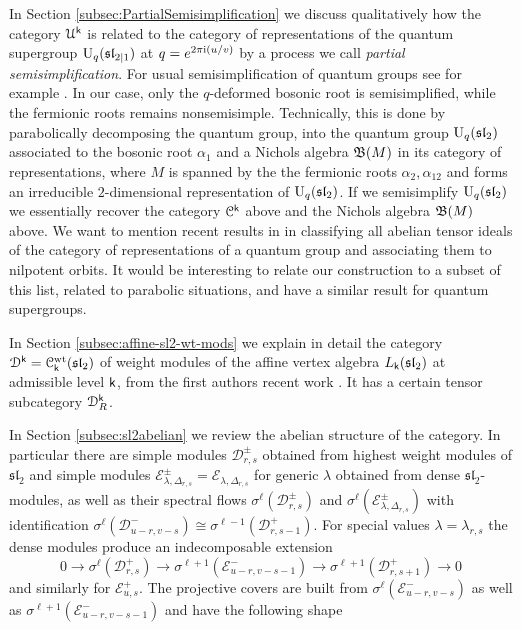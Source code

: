 \documentclass[a4paper, reqno]{amsart}
\theoremstyle{introTheorems}
\newcommand\cC{\mathcal{C}}
\newcommand\cD{\mathcal{D}}
\newcommand\cE{\mathcal{E}}
\newcommand\cU{\mathcal{U}}
\renewcommand\sl{\mathfrak{sl}}
\renewcommand{\1}{\mathbbold{1}}
\begin{document}
In Section \ref{subsec:PartialSemisimplification} we discuss qualitatively how the category $\cU^\k$ is related to the category of representations of the quantum supergroup $\Uq(\sl_{2|1})$ at $q=e^{2\pi\mathrm{i}(u/v)}$ by a process we call \emph{partial semisimplification}. For usual semisimplification of quantum groups see for example \cites{AP95,BK01}. In our case, only the $q$-deformed bosonic root is semisimplified, while the fermionic roots remains nonsemisimple. Technically, this is done by parabolically decomposing the quantum group, into the quantum group $\Uq(\sl_2)$ associated to the bosonic root $\alpha_1$ and a Nichols algebra $\mathfrak{B}(M)$ in its category of representations, where $M$ is spanned by the the fermionic roots $\alpha_2,\alpha_{12}$ and forms an irreducible $2$-dimensional representation of  $\Uq(\sl_2)$. If we semisimplify $\Uq(\sl_2)$ we essentially recover the category $\cC^\k$ above and the Nichols algebra $\mathfrak{B}(M)$ above. We want to mention recent results in \cite{CEO25} in classifying all abelian tensor ideals of the category of representations of a quantum group and associating them to nilpotent orbits.  It would be interesting to relate our construction to a subset of this list, related to parabolic situations, and have a similar result for quantum supergroups.

\bigskip

In Section \ref{subsec:affine-sl2-wt-mods} we explain in detail the category $\cD^\k=\cC_\k^{\mathrm{wt}}(\sl_2)$ of weight modules of the affine vertex algebra $L_\k(\sl_2)$ at admissible level $\mathsf{k}$, from the first authors recent work \cites{Cr24, CMY1, NORW24, ACK}. It has a certain tensor subcategory $\cD^\k_R$. 

In Section \ref{subsec:sl2abelian} we review the abelian structure of the category. In particular there are simple modules $\mathcal{D}^\pm_{r,s}$ obtained from highest weight modules of $\sl_2$ and simple modules $\mathcal{E}^\pm_{\lambda,\Delta_{r,s}}=\mathcal{E}_{\lambda,\Delta_{r,s}}$ for generic $\lambda$ obtained from dense $\sl_2$-modules, as well as their spectral flows $\sigma^\ell(\mathcal{D}^\pm_{r,s})$ and $\sigma^\ell(\mathcal{E}^\pm_{\lambda,\Delta_{r,s}})$ with identification $\sigma^{\ell}(\mathcal{D}^-_{u-r,v-s}) \cong \sigma^{\ell-1}(\mathcal{D}^+_{r,s-1})$. For special values $\lambda=\lambda_{r,s}$ the dense modules produce an indecomposable extension
 $$0 \longrightarrow \sigma^{\ell}(\cD_{r,s}^+) \longrightarrow \sigma^{\ell+1}(\cE_{u-r,v-s-1}^-) \longrightarrow \sigma^{\ell+1}(\cD^+_{r,s+1}) \longrightarrow 0$$
and similarly for $\cE_{u,s}^+$.
The projective covers are built from $\sigma^{\ell}(\cE_{u-r,v-s}^-)$ as well as $\sigma^{\ell+1}(\cE_{u-r,v-s-1}^-)$ and have the following shape
\end{document}

